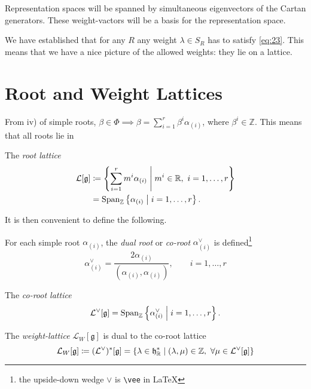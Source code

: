 
Representation spaces will be spanned by simultaneous eigenvectors of the Cartan generators. These weight-vactors will be a basis for the representation space.

We have established that for any $R$ any weight $\lambda \in S_R$ has to satisfy \eqref{eq:23}.
This means that we have a nice picture of the allowed weights: they lie on a lattice.

\section{Root and Weight Lattices}%
\label{sec:root_and_weight_lattices}

From iv) of simple roots, $\beta \in \Phi \implies \beta = \sum_{i=1}^{r} \beta^{i} \alpha_{(i)}$, where $\beta^{i} \in \mathbb{Z}$.
This means that all roots lie in
\begin{definition}[]
  The \emph{root lattice}
  \begin{align}
    \mathcal{L}[\mathfrak{g}] &\coloneqq \left\{ \sum_{i=1}^{r} m^{i} \alpha_{(i)} \suchthat m^{i} \in \mathbb{R},\  i = 1, \dots, r \right\} \\
      &= \text{Span}_{\mathbb{Z}}\left\{\alpha_{(i)} \suchthat i = 1, \dots, r\right\}.
  \end{align}
\end{definition}

It is then convenient to define the following.
\begin{definition}[]
  For each simple root $\alpha_{(i)}$, the \emph{dual root} or \emph{co-root} $\alpha_{(i)}^{\vee}$ is defined\footnote{the upside-down wedge $\vee$ is \texttt{\textbackslash vee} in \LaTeX}
  \begin{equation}
    \alpha_{(i)}^\vee = \frac{2 \alpha_{(i)}}{(\alpha_{(i)}, \alpha_{(i)})}, \qquad i = 1, \dots, r
  \end{equation}
\end{definition}
\begin{definition}[]
  The \emph{co-root lattice}
  \begin{equation}
    \mathcal{L}^\vee [\mathfrak{g}] = \text{Span}_{\mathbb{Z}}\left\{\alpha_{(i)}^\vee \suchthat i = 1, \dots, r\right\}.
  \end{equation}
\end{definition}
\begin{definition}[]
  The \emph{weight-lattice} $\mathcal{L}_W[\mathfrak{g}]$ is dual to the co-root lattice
  \begin{equation}
    \mathcal{L}_W[\mathfrak{g}] \coloneqq (\mathcal{L}^\vee)^*[\mathfrak{g}] = \left\{ \lambda \in \mathfrak{h}^*_{\mathbb{R}} \suchthat (\lambda, \mu) \in \mathbb{Z}, \ \forall \mu \in \mathcal{L}^\vee[\mathfrak{g}] \right\}
  \end{equation}
\end{definition}

